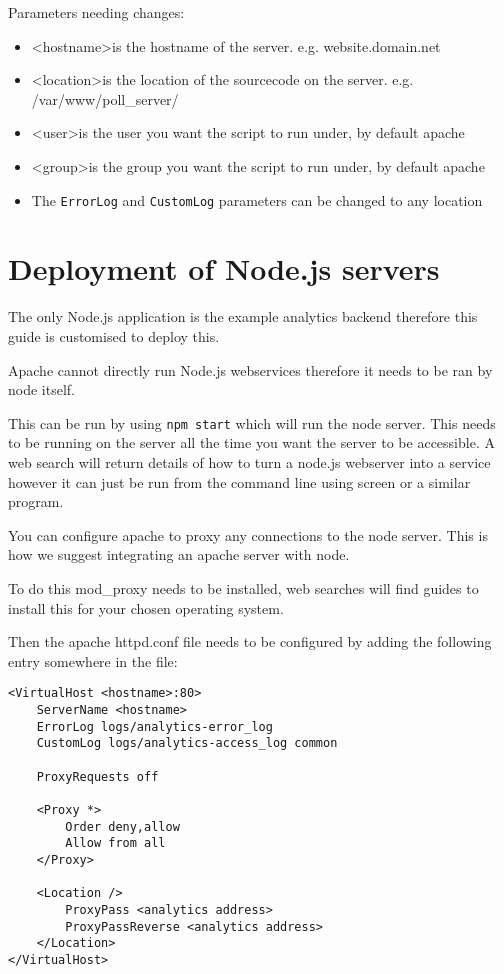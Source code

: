 Parameters needing changes:

\begin{itemize}
\item \textless hostname\textgreater is the hostname of the server. e.g. website.domain.net
\item \textless location\textgreater is the location of the sourcecode on the server. e.g. /var/www/poll\_server/
\item \textless user\textgreater is the user you want the script to run under, by default apache
\item \textless group\textgreater is the group you want the script to run under, by default apache
\item The \lstinline|ErrorLog| and \lstinline|CustomLog| parameters can be changed to any location

\end{itemize}

\section{Deployment of Node.js servers} \label{Section:Deployment of Node.js servers}

The only Node.js application is the example analytics backend therefore this guide is customised to deploy this.

Apache cannot directly run Node.js webservices therefore it needs to be ran by node itself.

This can be run by using \lstinline|npm start| which will run the node server. This needs to be running on the server all the time you want the server to be accessible.
A web search will return details of how to turn a node.js webserver into a service however it can just be run from the command line using screen or a similar program.

You can configure apache to proxy any connections to the node server. This is how we suggest integrating an apache server with node.

To do this mod\_proxy needs to be installed, web searches will find guides to install this for your chosen operating system.

Then the apache httpd.conf file needs to be configured by adding the following entry somewhere in the file:

\begin{lstlisting}[caption={Apache configuration}, label={code:apacheConfig_nodejs}]
<VirtualHost <hostname>:80>
	ServerName <hostname>
	ErrorLog logs/analytics-error_log
	CustomLog logs/analytics-access_log common

	ProxyRequests off
	
	<Proxy *>
		Order deny,allow
		Allow from all
	</Proxy>

	<Location />
		ProxyPass <analytics address>
		ProxyPassReverse <analytics address>
	</Location>
</VirtualHost>
\end{lstlisting}

